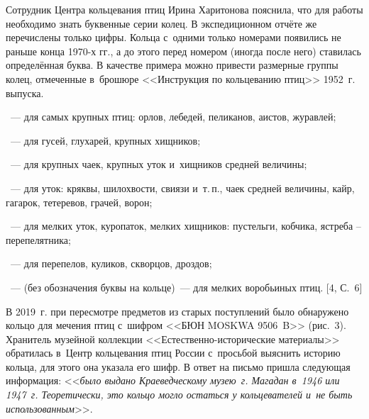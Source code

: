 

Сотрудник Центра кольцевания птиц Ирина Харитонова пояснила, что для работы необходимо знать буквенные серии колец. В экспедиционном отчёте же перечислены только цифры. Кольца с~одними только номерами появились не раньше конца 1970-х гг., а до этого перед номером (иногда после него) ставилась определённая буква. В качестве примера можно привести размерные группы колец, отмеченные в~брошюре <<Инструкция по кольцеванию птиц>> 1952~г. выпуска.

\begin{description}[noitemsep]\vspace{-10pt}
\item[Серия <<А>>]~--- для самых крупных птиц: орлов, лебедей, пеликанов, аистов, журавлей;
\item[Серия <<В>>]~--- для гусей, глухарей, крупных хищников;
\item[Серия <<С>>]~--- для крупных чаек, крупных уток и~хищников средней величины;
\item[Серия <<D>>]~--- для уток: кряквы, шилохвости, свиязи и~т.\,п., чаек средней величины, кайр, гагарок, тетеревов, грачей, ворон;
\item[Серия <<Е>>]~--- для мелких уток, куропаток, мелких хищников: пустельги, кобчика, ястреба – перепелятника;

\item[Серия <<F>>]~--- для перепелов, куликов, скворцов, дроздов;
\item[Серия <<G>>]~--- (без обозначения буквы на кольце)~--- для мелких воробьиных птиц. [4, С.~6]
\end{description}\vspace{-8pt}



В 2019~г. при пересмотре предметов из старых поступлений было обнаружено кольцо для мечения птиц с~шифром <<БЮН MOSKWA 9506~B>> (рис.~3). Хранитель музейной коллекции <<Естественно-исторические материалы>> обратилась в~Центр кольцевания птиц России с~просьбой выяснить историю кольца, для этого она указала его шифр. В ответ на письмо пришла следующая информация: <<\textit{ было выдано Краеведческому музею~г. Магадан в~1946 или 1947~г. Теоретически, это кольцо могло остаться у кольцевателей и~не быть использованным}>>.
\clearpage

